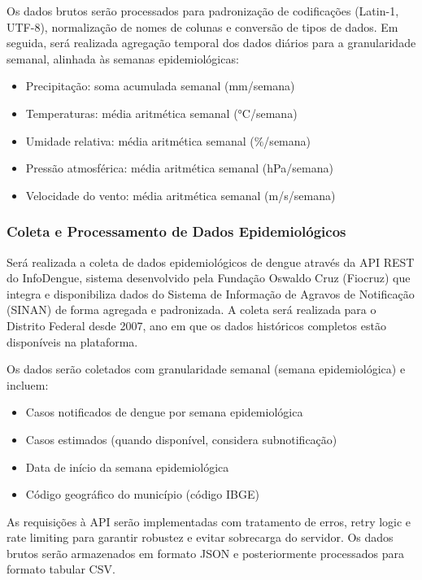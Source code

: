 Os dados brutos serão processados para padronização de codificações (Latin-1, UTF-8), normalização de nomes de colunas e conversão de tipos de dados. Em seguida, será realizada agregação temporal dos dados diários para a granularidade semanal, alinhada às semanas epidemiológicas:
\begin{itemize}
    \item Precipitação: soma acumulada semanal (mm/semana)
    \item Temperaturas: média aritmética semanal (°C/semana)
    \item Umidade relativa: média aritmética semanal (\%/semana)
    \item Pressão atmosférica: média aritmética semanal (hPa/semana)
    \item Velocidade do vento: média aritmética semanal (m/s/semana)
\end{itemize}

\subsubsection{Coleta e Processamento de Dados Epidemiológicos}

Será realizada a coleta de dados epidemiológicos de dengue através da API REST do InfoDengue, sistema desenvolvido pela Fundação Oswaldo Cruz (Fiocruz) que integra e disponibiliza dados do Sistema de Informação de Agravos de Notificação (SINAN) de forma agregada e padronizada. A coleta será realizada para o Distrito Federal desde 2007, ano em que os dados históricos completos estão disponíveis na plataforma.

Os dados serão coletados com granularidade semanal (semana epidemiológica) e incluem:
\begin{itemize}
    \item Casos notificados de dengue por semana epidemiológica
    \item Casos estimados (quando disponível, considera subnotificação)
    \item Data de início da semana epidemiológica
    \item Código geográfico do município (código IBGE)
\end{itemize}

As requisições à API serão implementadas com tratamento de erros, retry logic e rate limiting para garantir robustez e evitar sobrecarga do servidor. Os dados brutos serão armazenados em formato JSON e posteriormente processados para formato tabular CSV.


